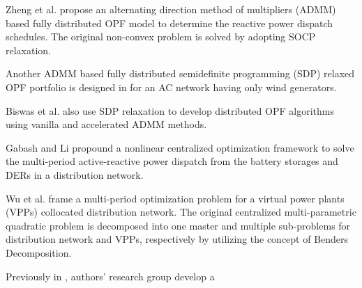 \documentclass{article}
\begin{document}
Zheng et al. \cite{Zheng} propose an alternating direction method of multipliers (ADMM) based fully distributed OPF model to determine the reactive power dispatch schedules. The original non-convex problem is solved by adopting SOCP relaxation.

Another ADMM based fully distributed semidefinite programming (SDP) relaxed OPF portfolio is designed in  \cite{Wang} for an AC network having only wind generators. 

Biswas et al. \cite{Biswas} also use SDP relaxation to develop distributed OPF algorithms using vanilla and accelerated ADMM methods. 

Gabash and Li \cite{Gabash} propound a nonlinear centralized optimization framework to solve the multi-period active-reactive power dispatch from the battery storages and DERs in a distribution network. 

Wu et al. \cite{Wu} frame a multi-period optimization problem for a virtual power plants (VPPs) collocated distribution network. The original centralized multi-parametric quadratic problem is decomposed into one master and multiple sub-problems for distribution network and VPPs, respectively by utilizing the concept of Benders Decomposition. 



Previously in \cite{Sadnan}, authors' research group develop a 
\end{document}
